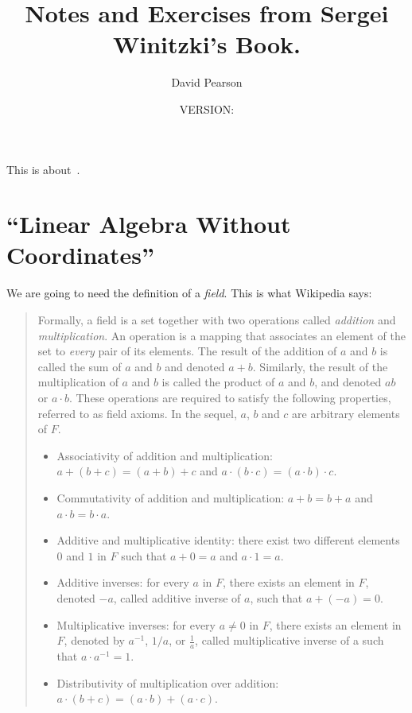 \documentclass[a4paper,11pt]{article}
\numberwithin{equation}{section}
\begin{document}
\author{David Pearson}
\title{Notes and Exercises from Sergei Winitzki's Book.}
\date{VERSION: \version}
\maketitle
\tableofcontents
This is about~\cite{Winitzki}.
\section{``Linear Algebra Without Coordinates''}
We are going to need the definition of a {\em field}.
This is what Wikipedia says:
\begin{quote}
Formally, a field is a set together with two operations called {\em addition} 
and {\em multiplication}. 
An operation is a mapping that associates an element 
of the set to {\em every} pair of its elements. 
The result of the addition of $a$ 
and $b$ is called the sum of $a$ and $b$ and denoted $a + b$. 
Similarly, the 
result of the multiplication of $a$ and $b$ is called the product of $a$ and 
$b$, and denoted $ab$ or $a\cdot b$. 
These operations are required to satisfy 
the following properties, referred to as field axioms. 
In the sequel, $a$, $b$ and $c$ 
are arbitrary elements of $F$.
\begin{itemize}
    \item Associativity of addition and multiplication: 
        $a + (b + c) = (a + b) + c$ and 
        $a \cdot (b \cdot c) = (a \cdot b) \cdot c$.
    \item Commutativity of addition and multiplication: 
        $a + b = b + a$ and 
        $a \cdot b = b \cdot a$.
    \item Additive and multiplicative identity: there exist two different 
        elements $0$ and $1$ in $F$ such that $a + 0 = a$ and $a \cdot 1 = a$.
    \item Additive inverses: for every $a$ in $F$, there exists an element in 
        $F$, denoted $-a$, called additive inverse of $a$, such that
        $a + (-a) = 0$.
    \item Multiplicative inverses: for every $a \neq 0$ in $F$, there exists an 
        element in $F$, denoted by $a^{-1}$, $1/a$, or $\frac{1}{a}$, called 
        multiplicative inverse of a such that $a \cdot a^{-1} = 1$.
    \item Distributivity of multiplication over addition: 
        $a \cdot (b + c) = (a \cdot b) + (a \cdot c)$.
\end{itemize}
\end{quote}
\end{document}
